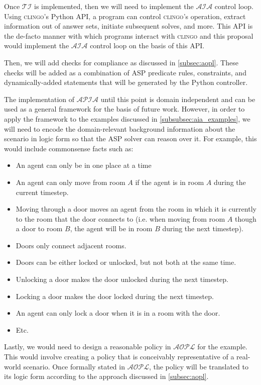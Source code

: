 Once $\mathcal{TI}$ is implemented, then we will need to implement the $\mathcal{AIA}$ control loop.
Using \textsc{clingo}'s Python API, a program can control \textsc{clingo}'s operation, extract information out of answer sets, initiate subsequent solves, and more.
This API is the de-facto manner with which programs interact with \textsc{clingo} and this proposal would implement the $\mathcal{AIA}$ control loop on the basis of this API.

Then, we will add checks for compliance as discussed in \cref{subsec:aopl}.
These checks will be added as a combination of ASP predicate rules, constraints, and dynamically-added statements that will be generated by the Python controller.

The implementation of $\mathcal{APIA}$ until this point is domain independent and can be used as a general framework for the basis of future work.
However, in order to apply the framework to the examples discussed in \cref{subsubsec:aia_examples}, we will need to encode the domain-relevant background information about the scenario in logic form so that the ASP solver can reason over it.
For example, this would include commonsense facts such as:

\begin{itemize}
    \item An agent can only be in one place at a time
    \item An agent can only move from room $A$ if the agent is in room $A$ during the current timestep.
    \item Moving through a door moves an agent from the room in which it is currently to the room that the door connects to (i.e. when moving from room $A$ though a door to room $B$, the agent will be in room $B$ during the next timestep).
    \item Doors only connect adjacent rooms.
    \item Doors can be either locked or unlocked, but not both at the same time.
    \item Unlocking a door makes the door unlocked during the next timestep.
    \item Locking a door makes the door locked during the next timestep.
    \item An agent can only lock a door when it is in a room with the door.
    \item Etc.
\end{itemize}

Lastly, we would need to design a reasonable policy in $\mathcal{AOPL}$ for the example.
This would involve creating a policy that is conceivably representative of a real-world scenario.
Once formally stated in $\mathcal{AOPL}$, the policy will be translated to its logic form according to the approach discussed in \cref{subsec:aopl}.

